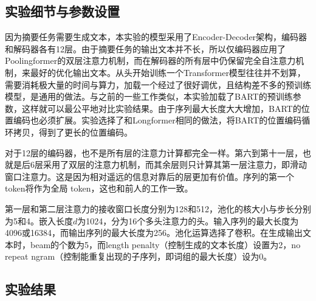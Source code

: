\subsection{实验细节与参数设置}

因为摘要任务需要生成文本，本实验的模型采用了Encoder-Decoder架构，编码器和解码器各有12层。由于摘要任务的输出文本并不长，所以仅编码器应用了Poolingformer的双层注意力机制，而在解码器的所有层中仍保留完全自注意力机制，来最好的优化输出文本。从头开始训练一个Transformer模型往往并不划算，需要消耗极大量的时间与算力，加载一个经过了很好调优，且结构差不多的预训练模型，是通用的做法。与之前的一些工作\cite{beltagy2020longformer}类似，本实验加载了BART\cite{lewis2019bart}的预训练参数，这样就可以最公平地对比实验结果。由于序列最大长度大大增加，BART的位置编码也必须扩展。实验选择了和Longformer相同的做法，将BART的位置编码循环拷贝，得到了更长的位置编码。

对于12层的编码器，也不是所有层的注意力计算都完全一样。第六到第十一层，也就是后6层采用了双层的注意力机制，而其余层则只计算其第一层注意力，即滑动窗口注意力。这是因为相对遥远的信息对靠后的层更加有价值。序列的第一个token将作为全局 token，这也和前人的工作一致。

第一层和第二层注意力的接收窗口长度分别为128和512，池化的核大小与步长分别为5和4。嵌入长度$d$为1024，分为16个多头注意力的头。输入序列的最大长度为4096或16384，而输出序列的最大长度为256。池化运算选择了卷积。在生成输出文本时，beam的个数为5，而length penalty（控制生成的文本长度）设置为2，no repeat ngram（控制能重复出现的子序列，即词组的最大长度）设为0。

\subsection{实验结果}

\begin{table}[ht]
\caption{ 相关模型在arXiv测试集上的结果。 }
\label{table.arxivResult}
\begin{center}
\end{center}
\end{table}


